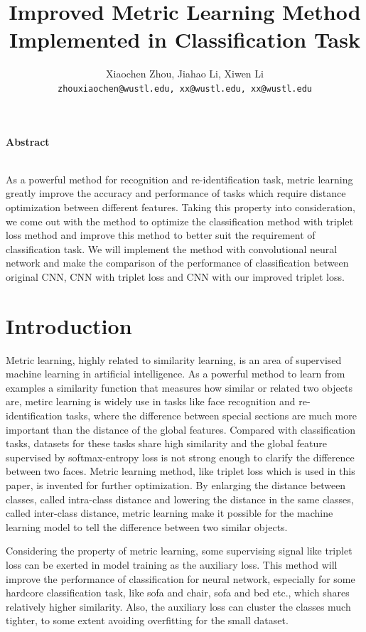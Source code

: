 \documentclass[10pt,twocolumn,letterpaper]{article}
\date{}
\title{Improved Metric Learning Method Implemented in Classification Task}
\author{%
Xiaochen Zhou, Jiahao Li, Xiwen Li\\
{\tt zhouxiaochen@wustl.edu, xx@wustl.edu, xx@wustl.edu}
}
\begin{document}
\maketitle

\begin{center}\textbf{Abstract}\\~\\\parbox{0.475\textwidth}{\em

As a powerful method for recognition and re-identification task, metric learning greatly improve the accuracy and performance of tasks which require distance optimization between different features. Taking this property into consideration, we come out with the method to optimize the classification method with triplet loss method and improve this method to better suit the requirement of classification task. We will implement the method with convolutional neural network and make the comparison of the performance of classification between original CNN, CNN with triplet loss and CNN with our improved triplet loss.
}\end{center}

\section{Introduction}

Metric learning, highly related to similarity learning, is an area of supervised machine learning in artificial intelligence. As a powerful method to learn from examples a similarity function that measures how similar or related two objects are, metirc learning is widely use in tasks like face recognition and re-identification tasks, where the difference between special sections are much more important than the distance of the global features. Compared with classification tasks, datasets for these tasks share high similarity and the global feature supervised by softmax-entropy loss is not strong enough to clarify the difference between two faces. Metric learning method, like triplet loss which is used in this paper, is invented for further optimization. By enlarging the distance between classes, called intra-class distance and lowering the distance in the same classes, called inter-class distance, metric learning make it possible for the machine learning model to tell the difference between two similar objects.

Considering the property of metric learning, some supervising signal like triplet loss can be exerted in model training as the auxiliary loss. This method will improve the performance of classification for neural network, especially for some hardcore classification task, like sofa and chair, sofa and bed etc., which shares relatively higher similarity. Also, the auxiliary loss can cluster the classes much tighter, to some extent avoiding overfitting for the small dataset.
\end{document}
